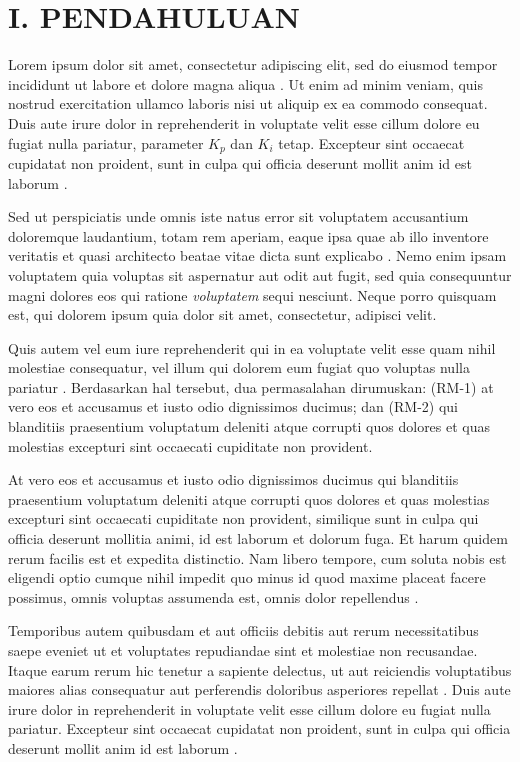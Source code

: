 \section{I. PENDAHULUAN}

Lorem ipsum dolor sit amet, consectetur adipiscing elit, sed do eiusmod tempor
incididunt ut labore et dolore magna aliqua \cite{ContohSatu2024}. Ut enim ad
minim veniam, quis nostrud exercitation ullamco laboris nisi ut aliquip ex ea
commodo consequat. Duis aute irure dolor in reprehenderit in voluptate velit
esse cillum dolore eu fugiat nulla pariatur, parameter $K_p$ dan $K_i$ tetap.
Excepteur sint occaecat cupidatat non proident, sunt in culpa qui officia
deserunt mollit anim id est laborum \cite{ContohDua2023}.

Sed ut perspiciatis unde omnis iste natus error sit voluptatem accusantium
doloremque laudantium, totam rem aperiam, eaque ipsa quae ab illo inventore
veritatis et quasi architecto beatae vitae dicta sunt explicabo
\cite{ContohSatu2024,ContohProsiding2022}. Nemo enim ipsam voluptatem quia
voluptas sit aspernatur aut odit aut fugit, sed quia consequuntur magni dolores
eos qui ratione \textit{voluptatem} sequi nesciunt. Neque porro quisquam est,
qui dolorem ipsum quia dolor sit amet, consectetur, adipisci velit.

Quis autem vel eum iure reprehenderit qui in ea voluptate velit esse quam nihil
molestiae consequatur, vel illum qui dolorem eum fugiat quo voluptas nulla
pariatur \cite{ContohBuku2011}. Berdasarkan hal tersebut, dua permasalahan
dirumuskan: (RM-1) at vero eos et accusamus et iusto odio dignissimos ducimus;
dan (RM-2) qui blanditiis praesentium voluptatum deleniti atque corrupti quos
dolores et quas molestias excepturi sint occaecati cupiditate non provident.

At vero eos et accusamus et iusto odio dignissimos ducimus qui blanditiis
praesentium voluptatum deleniti atque corrupti quos dolores et quas molestias
excepturi sint occaecati cupiditate non provident, similique sunt in culpa qui
officia deserunt mollitia animi, id est laborum et dolorum fuga. Et harum quidem
rerum facilis est et expedita distinctio. Nam libero tempore, cum soluta nobis
est eligendi optio cumque nihil impedit quo minus id quod maxime placeat facere
possimus, omnis voluptas assumenda est, omnis dolor repellendus \cite{ContohDua2023}.

Temporibus autem quibusdam et aut officiis debitis aut rerum necessitatibus
saepe eveniet ut et voluptates repudiandae sint et molestiae non recusandae.
Itaque earum rerum hic tenetur a sapiente delectus, ut aut reiciendis
voluptatibus maiores alias consequatur aut perferendis doloribus asperiores
repellat \cite{ContohSatu2024}. Duis aute irure dolor in reprehenderit in
voluptate velit esse cillum dolore eu fugiat nulla pariatur. Excepteur sint
occaecat cupidatat non proident, sunt in culpa qui officia deserunt mollit anim
id est laborum \cite{ContohProsiding2022}.

